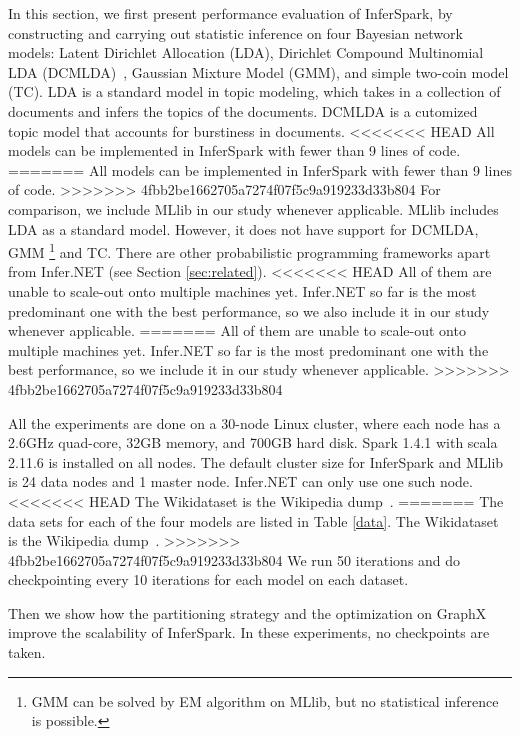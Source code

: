 In this section, we first present performance evaluation of InferSpark,
by constructing and carrying out statistic inference on four Bayesian
network models:
Latent Dirichlet Allocation (LDA), Dirichlet Compound Multinomial LDA
(DCMLDA)~\cite{Doyle2009}, Gaussian Mixture Model (GMM), and simple two-coin
model (TC). LDA is a standard model in topic modeling,
which takes in a collection of documents
and infers the topics of the documents.
DCMLDA is a cutomized topic model that accounts for burstiness in documents.
<<<<<<< HEAD
All models can be implemented in InferSpark with fewer than 9 lines of code.
=======
All models can be implemented in InferSpark with fewer than 9 lines of code. 
>>>>>>> 4fbb2be1662705a7274f07f5c9a919233d33b804
For comparison, we include MLlib in our study whenever applicable.
MLlib includes LDA as a standard model.
However, it does not have support for DCMLDA, GMM \footnote{GMM can be solved
by EM algorithm on MLlib, but no statistical inference is possible.}
and TC. There are other probabilistic programming frameworks apart from
Infer.NET (see Section \ref{sec:related}).
<<<<<<< HEAD
All of them are unable to scale-out onto multiple machines yet.
Infer.NET so far is the most predominant one with the best performance, so we also include it in our study whenever applicable.
=======
All of them are unable to scale-out onto multiple machines yet.  
Infer.NET so far is the most predominant one with the best performance, 
so we include it in our study whenever applicable.
>>>>>>> 4fbb2be1662705a7274f07f5c9a919233d33b804

All the experiments are done on a 30-node Linux cluster, where each node
has a 2.6GHz quad-core, 32GB memory, and 700GB hard disk.
Spark 1.4.1 with scala 2.11.6 is installed on all nodes.
The default cluster size for InferSpark and MLlib is 24 data nodes
and 1 master node.  Infer.NET can only use one such node.
<<<<<<< HEAD
The Wikidataset is the Wikipedia dump~\cite{wikidump}.
=======
The data sets for each of the four models are listed in Table \ref{data}.
The Wikidataset is the Wikipedia dump~\cite{}. 
>>>>>>> 4fbb2be1662705a7274f07f5c9a919233d33b804
We run 50 iterations and do checkpointing every 10 iterations
for each model on each dataset.

Then we show how the partitioning strategy and the optimization on GraphX
improve the scalability of InferSpark. In these experiments,
no checkpoints are taken.

